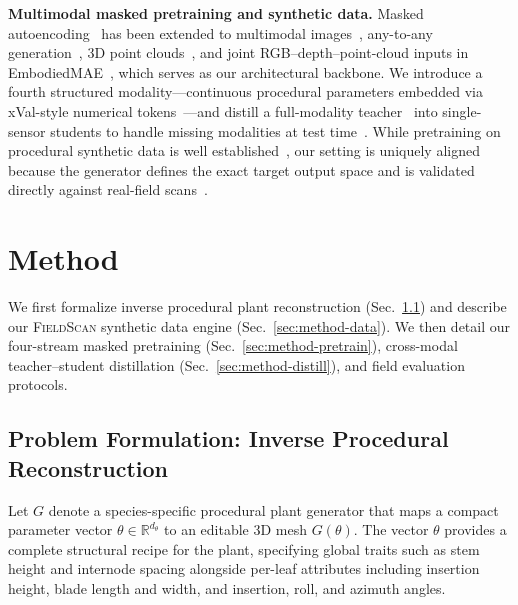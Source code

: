 \documentclass[10pt,twocolumn,letterpaper]{article}
\newcommand{\dataset}{\textsc{FieldScan}}
\providecommand{\R}{\mathbb{R}}
\begin{document}
\noindent\textbf{Multimodal masked pretraining and synthetic data.}
Masked autoencoding~\citep{he2022mae} has been extended to multimodal images~\citep{bachmann2022multimae}, any-to-any generation~\citep{mizrahi2023fourm,bachmann2024fourm21}, 3D point clouds~\citep{pang2022pointmae}, and joint RGB--depth--point-cloud inputs in EmbodiedMAE~\citep{dong2025embodiedmae}, which serves as our architectural backbone. We introduce a fourth structured modality---continuous procedural parameters embedded via xVal-style numerical tokens~\citep{golkar2023xval}---and distill a full-modality teacher~\citep{hinton2015distillation} into single-sensor students to handle missing modalities at test time~\citep{wang2024robustmissing}. While pretraining on procedural synthetic data is well established~\citep{kataoka2020fractaldb,raistrick2023infinigen,greff2022kubric,tobin2017domainrand,fan2023intriguing}, our setting is uniquely aligned because the generator defines the exact target output space and is validated directly against real-field scans~\citep{maizefield3d2025}.

\section{Method}
\label{sec:method}

We first formalize inverse procedural plant reconstruction (Sec.~\ref{sec:method-form}) and describe our \dataset{} synthetic data engine (Sec.~\ref{sec:method-data}). We then detail our four-stream masked pretraining (Sec.~\ref{sec:method-pretrain}), cross-modal teacher--student distillation (Sec.~\ref{sec:method-distill}), and field evaluation protocols.

\subsection{Problem Formulation: Inverse Procedural Reconstruction}
\label{sec:method-form}

Let $G$ denote a species-specific procedural plant generator that maps a compact parameter vector $\theta \in \R^{d_\theta}$ to an editable 3D mesh $G(\theta)$. The vector $\theta$ provides a complete structural recipe for the plant, specifying global traits such as stem height and internode spacing alongside per-leaf attributes including insertion height, blade length and width, and insertion, roll, and azimuth angles.
\end{document}
